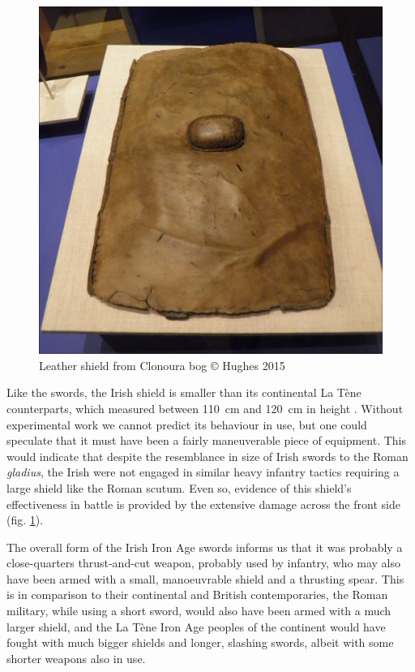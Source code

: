 \begin{figure}
\includegraphics[width=\linewidth]{figures/Hughes_Sword_fig08.jpg} 
\caption{Leather shield from Clonoura bog © Hughes 2015}
\label{hughes_fig8}
\end{figure}
Like the swords, the Irish shield is smaller than its continental La Tène counterparts, which measured between \SI{110}{\cm} and \SI{120}{\cm} in height \parencite[165]{Lejars2007}. 
Without experimental work we cannot predict its behaviour in use, but one could speculate that it must have been a fairly maneuverable piece of equipment. 
This would indicate that despite the resemblance in size of Irish swords to the Roman \emph{gladius}, the Irish were not engaged in similar heavy infantry tactics requiring a large shield like the Roman scutum. 
Even so, evidence of this shield’s effectiveness in battle is provided by the extensive damage across the front side (fig. \ref{hughes_fig8}).





The overall form of the Irish Iron Age swords informs us that it was probably a close-quarters thrust-and-cut weapon, probably used by infantry, who may also have been armed with a small, manoeuvrable shield and a thrusting spear. This is in comparison to their continental and British contemporaries, the Roman military, while using a short sword, would also have been armed with a much larger shield, and the La Tène Iron Age peoples of the continent would have fought with much bigger shields and longer, slashing swords, albeit with some shorter weapons also in use.

